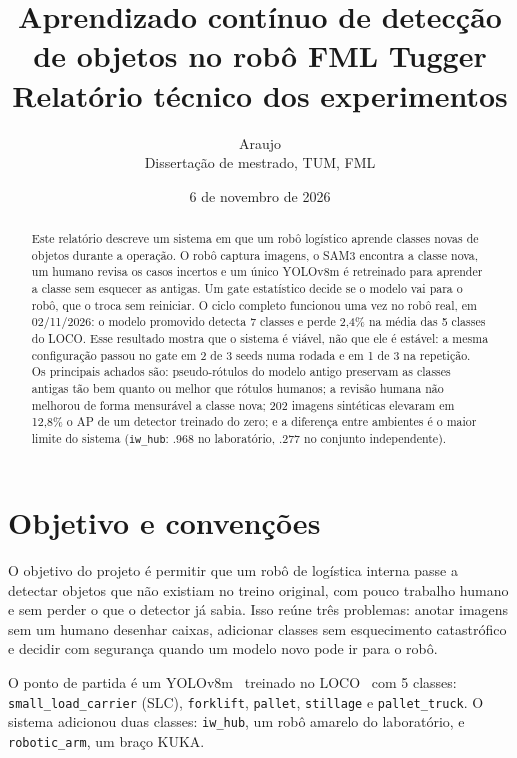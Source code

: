 \documentclass[11pt,a4paper]{article}
\title{Aprendizado contínuo de detecção de objetos no robô FML Tugger\\[4pt]
\large Relatório técnico dos experimentos}
\author{Araujo\\Dissertação de mestrado, TUM, FML}
\date{6 de novembro de 2026}
\begin{document}
\maketitle

\begin{abstract}
Este relatório descreve um sistema em que um robô logístico aprende classes
novas de objetos durante a operação. O robô captura imagens, o SAM3 encontra a
classe nova, um humano revisa os casos incertos e um único YOLOv8m é retreinado
para aprender a classe sem esquecer as antigas. Um gate estatístico decide se o
modelo vai para o robô, que o troca sem reiniciar. O ciclo completo funcionou
uma vez no robô real, em 02/11/2026: o modelo promovido detecta 7 classes e
perde 2,4\% na média das 5 classes do LOCO. Esse resultado mostra que o sistema
é viável, não que ele é estável: a mesma configuração passou no gate em 2 de 3
seeds numa rodada e em 1 de 3 na repetição. Os principais achados são:
pseudo-rótulos do modelo antigo preservam as classes antigas tão bem quanto ou
melhor que rótulos humanos; a revisão humana não melhorou de forma mensurável a
classe nova; 202 imagens sintéticas elevaram em 12,8\% o AP de um detector
treinado do zero; e a diferença entre ambientes é o maior limite do sistema
(\texttt{iw\_hub}: .968 no laboratório, .277 no conjunto independente).
\end{abstract}

\tableofcontents
\newpage

\section{Objetivo e convenções}

O objetivo do projeto é permitir que um robô de logística interna passe a
detectar objetos que não existiam no treino original, com pouco trabalho
humano e sem perder o que o detector já sabia. Isso reúne três problemas:
anotar imagens sem um humano desenhar caixas, adicionar classes sem esquecimento
catastrófico e decidir com segurança quando um modelo novo pode ir para o robô.

O ponto de partida é um YOLOv8m~\cite{yolov8} treinado no LOCO~\cite{loco}
com 5 classes: \texttt{small\_load\_carrier} (SLC), \texttt{forklift},
\texttt{pallet}, \texttt{stillage} e \texttt{pallet\_truck}. O sistema adicionou
duas classes: \texttt{iw\_hub}, um robô amarelo do laboratório, e
\texttt{robotic\_arm}, um braço KUKA.
\end{document}
